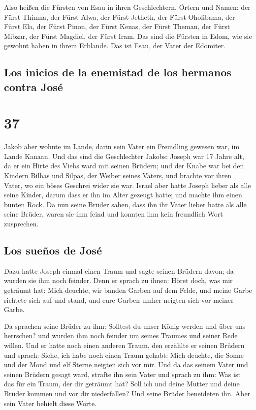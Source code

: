  Also heißen die Fürsten von Esau in ihren Geschlechtern,
Örtern und Namen: der Fürst Thimna, der Fürst Alwa, der Fürst Jetheth,
 der Fürst Oholibama, der Fürst Ela, der Fürst Pinon,
 der Fürst Kenas, der Fürst Theman, der Fürst Mibzar,
 der Fürst Magdiel, der Fürst Iram. Das sind die Fürsten
in Edom, wie sie gewohnt haben in ihrem Erblande. Das ist Esau, der
Vater der Edomiter.

\hypertarget{los-inicios-de-la-enemistad-de-los-hermanos-contra-josuxe9}{%
\subsection{Los inicios de la enemistad de los hermanos contra
José}\label{los-inicios-de-la-enemistad-de-los-hermanos-contra-josuxe9}}

\hypertarget{section-36}{%
\section{37}\label{section-36}}

 Jakob aber wohnte im Lande, darin sein Vater ein
Fremdling gewesen war, im Lande Kanaan.  Und das sind die
Geschlechter Jakobs: Joseph war 17 Jahre alt, da er ein Hirte des Viehs
ward mit seinen Brüdern; und der Knabe war bei den Kindern Bilhas und
Silpas, der Weiber seines Vaters, und brachte vor ihren Vater, wo ein
böses Geschrei wider sie war.  Israel aber hatte Joseph
lieber als alle seine Kinder, darum dass er ihn im Alter gezeugt hatte;
und machte ihm einen bunten Rock.  Da nun seine Brüder
sahen, dass ihn ihr Vater lieber hatte als alle seine Brüder, waren sie
ihm feind und konnten ihm kein freundlich Wort zusprechen.

\hypertarget{los-sueuxf1os-de-josuxe9}{%
\subsection{Los sueños de José}\label{los-sueuxf1os-de-josuxe9}}

 Dazu hatte Joseph einmal einen Traum und sagte seinen
Brüdern davon; da wurden sie ihm noch feinder.  Denn er
sprach zu ihnen: Höret doch, was mir geträumt hat:  Mich
deuchte, wir banden Garben auf dem Felde, und meine Garbe richtete sich
auf und stand, und eure Garben umher neigten sich vor meiner Garbe.

 Da sprachen seine Brüder zu ihm: Solltest du unser König
werden und über uns herrschen? und wurden ihm noch feinder um seines
Traumes und seiner Rede willen.  Und er hatte noch einen
anderen Traum, den erzählte er seinen Brüdern und sprach: Siehe, ich
habe noch einen Traum gehabt: Mich deuchte, die Sonne und der Mond und
elf Sterne neigten sich vor mir.  Und da das seinem Vater
und seinen Brüdern gesagt ward, strafte ihn sein Vater und sprach zu
ihm: Was ist das für ein Traum, der dir geträumt hat? Soll ich und deine
Mutter und deine Brüder kommen und vor dir niederfallen? 
Und seine Brüder beneideten ihn. Aber sein Vater behielt diese Worte.

